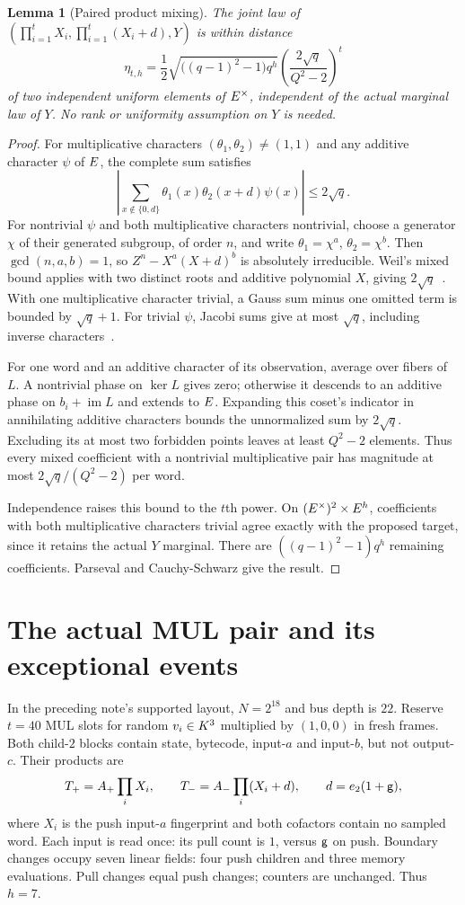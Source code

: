 \documentclass[11pt]{article}
\newtheorem{lemma}{Lemma}
\begin{document}
\begin{lemma}[Paired product mixing]
The joint law of $(\prod_{i=1}^tX_i,\prod_{i=1}^t(X_i+d),Y)$ is within distance
\[
 \eta_{t,h}=\frac12\sqrt{\bigl((q-1)^2-1\bigr)q^h}
 \left(\frac{2\sqrt q}{Q^2-2}\right)^t
\]
of two independent uniform elements of $E^\times$, independent of the \emph{actual marginal law} of $Y$. No rank or uniformity assumption on $Y$ is needed.
\end{lemma}
\begin{proof}
For multiplicative characters $(\theta_1,\theta_2)\ne(1,1)$ and any additive character $\psi$ of $E$, the complete sum satisfies
\[
 \left|\sum_{x\notin\{0,d\}}\theta_1(x)\theta_2(x+d)\psi(x)\right|
 \le 2\sqrt q.
\]
For nontrivial $\psi$ and both multiplicative characters nontrivial, choose a generator $\chi$ of their generated subgroup, of order $n$, and write $\theta_1=\chi^a$, $\theta_2=\chi^b$. Then $\gcd(n,a,b)=1$, so $Z^n-X^a(X+d)^b$ is absolutely irreducible. Weil's mixed bound applies with two distinct roots and additive polynomial $X$, giving $2\sqrt q$~\cite{winger}. With one multiplicative character trivial, a Gauss sum minus one omitted term is bounded by $\sqrt q+1$. For trivial $\psi$, Jacobi sums give at most $\sqrt q$, including inverse characters~\cite{conrad}.

For one word and an additive character of its observation, average over fibers of $L$. A nontrivial phase on $\ker L$ gives zero; otherwise it descends to an additive phase on $b_i+\operatorname{im}L$ and extends to $E$. Expanding this coset's indicator in annihilating additive characters bounds the unnormalized sum by $2\sqrt q$. Excluding its at most two forbidden points leaves at least $Q^2-2$ elements. Thus every mixed coefficient with a nontrivial multiplicative pair has magnitude at most $2\sqrt q/(Q^2-2)$ per word.

Independence raises this bound to the $t$th power. On $(E^\times)^2\times E^h$, coefficients with both multiplicative characters trivial agree exactly with the proposed target, since it retains the actual $Y$ marginal. There are $((q-1)^2-1)q^h$ remaining coefficients. Parseval and Cauchy-Schwarz give the result.
\end{proof}

\section{The actual MUL pair and its exceptional events}

In the preceding note's supported layout, $N=2^{18}$ and bus depth is $22$. Reserve $t=40$ MUL slots for random $v_i\in K^3$ multiplied by $(1,0,0)$ in fresh frames. Both child-$2$ blocks contain state, bytecode, input-$a$ and input-$b$, but not output-$c$. Their products are
\[
 T_+=A_+\prod_i X_i,\qquad T_-=A_-\prod_i(X_i+d),
 \qquad d=e_2(1+\mathsf{g}),
\]
where $X_i$ is the push input-$a$ fingerprint and both cofactors contain no sampled word. Each input is read once: its pull count is $1$, versus $\mathsf{g}$ on push. Boundary changes occupy seven linear fields: four push children and three memory evaluations. Pull changes equal push changes; counters are unchanged. Thus $h=7$.
\end{document}
